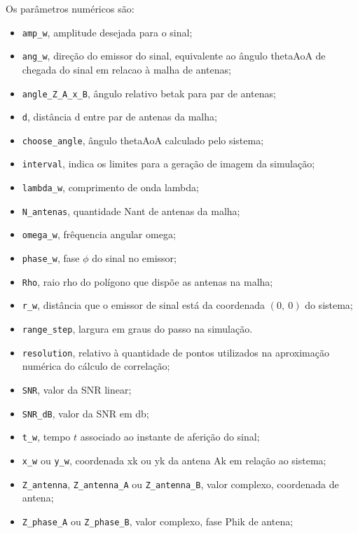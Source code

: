 Os parâmetros numéricos são:
\begin{itemize}
	\item \lstinline|amp_w|, amplitude desejada para o sinal;
	\item \lstinline|ang_w|, direção do emissor do sinal, equivalente ao ângulo \ac{thetaAoA} de chegada do sinal em relacao à malha de antenas;
	\item \lstinline|angle_Z_A_x_B|, ângulo relativo \ac{betak} para par de antenas;
	\item \lstinline|d|, distância \ac{d} entre par de antenas da malha;
	\item \lstinline|choose_angle|, ângulo \ac{thetaAoA} calculado pelo sistema;
	\item \lstinline|interval|, indica os limites para a geração de imagem da simulação;
	\item \lstinline|lambda_w|, comprimento de onda \ac{lambda};
	\item \lstinline|N_antenas|, quantidade \ac{Nant} de antenas da malha;
	\item \lstinline|omega_w|, frêquencia angular \ac{omega};
	\item \lstinline|phase_w|, fase $\phi$ do sinal no emissor;
	\item \lstinline|Rho|, raio \ac{rho} do polígono que dispõe as antenas na malha;
	\item \lstinline|r_w|, distância que o emissor de sinal está da coordenada $(0,~0)$ do sistema;
	\item \lstinline|range_step|, largura em graus do passo na simulação.
	\item \lstinline|resolution|, relativo à quantidade de pontos utilizados na aproximação numérica do cálculo de correlação;
	\item \lstinline|SNR|, valor da \ac{SNR} linear;
	\item \lstinline|SNR_dB|, valor da \ac{SNR} em \si{\decibel};
	\item \lstinline|t_w|, tempo $t$ associado ao instante de aferição do sinal;
	\item \lstinline|x_w| ou \lstinline|y_w|, coordenada \ac{xk} ou \ac{yk} da antena \ac{Ak} em relação ao sistema;
	\item \lstinline|Z_antenna|, \lstinline|Z_antenna_A| ou \lstinline|Z_antenna_B|, valor complexo, coordenada de antena;
	\item \lstinline|Z_phase_A| ou \lstinline|Z_phase_B|, valor complexo, fase \ac{Phik} de antena;
\end{itemize}


